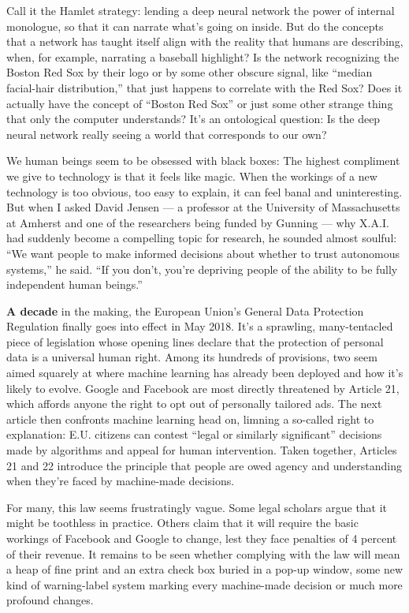 Call it the Hamlet strategy: lending a deep neural network the power of
internal monologue, so that it can narrate what's going on inside. But
do the concepts that a network has taught itself align with the reality
that humans are describing, when, for example, narrating a baseball
highlight? Is the network recognizing the Boston Red Sox by their logo
or by some other obscure signal, like ``median facial-hair
distribution,'' that just happens to correlate with the Red Sox? Does it
actually have the concept of ``Boston Red Sox'' or just some other
strange thing that only the computer understands? It's an ontological
question: Is the deep neural network really seeing a world that
corresponds to our own?

We human beings seem to be obsessed with black boxes: The highest
compliment we give to technology is that it feels like magic. When the
workings of a new technology is too obvious, too easy to explain, it can
feel banal and uninteresting. But when I asked David Jensen --- a
professor at the University of Massachusetts at Amherst and one of the
researchers being funded by Gunning --- why X.A.I. had suddenly become a
compelling topic for research, he sounded almost soulful: ``We want
people to make informed decisions about whether to trust autonomous
systems,'' he said. ``If you don't, you're depriving people of the
ability to be fully independent human beings.''

\textbf{A decade} in the making, the European Union's General Data
Protection Regulation finally goes into effect in May 2018. It's a
sprawling, many-tentacled piece of legislation whose opening lines
declare that the protection of personal data is a universal human right.
Among its hundreds of provisions, two seem aimed squarely at where
machine learning has already been deployed and how it's likely to
evolve. Google and Facebook are most directly threatened by Article 21,
which affords anyone the right to opt out of personally tailored ads.
The next article then confronts machine learning head on, limning a
so-called right to explanation: E.U. citizens can contest ``legal or
similarly significant'' decisions made by algorithms and appeal for
human intervention. Taken together, Articles 21 and 22 introduce the
principle that people are owed agency and understanding when they're
faced by machine-made decisions.

For many, this law seems frustratingly vague. Some legal scholars argue
that it might be toothless in practice. Others claim that it will
require the basic workings of Facebook and Google to change, lest they
face penalties of 4 percent of their revenue. It remains to be seen
whether complying with the law will mean a heap of fine print and an
extra check box buried in a pop-up window, some new kind of
warning-label system marking every machine-made decision or much more
profound changes.

